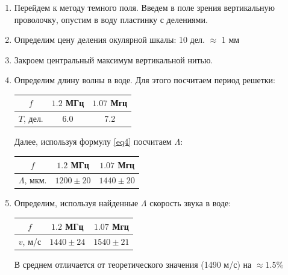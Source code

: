 \documentclass[a4paper, 12pt]{article}
\begin{document}
\begin{enumerate}
        \item Перейдем к методу темного поля. Введем в поле зрения вертикальную проволочку, опустим в воду пластинку с делениями.
        \item Определим цену деления окулярной шкалы: 10 дел. $\approx$ 1 мм
        \item Закроем центральный максимум вертикальной нитью.
        \item Определим длину волны в воде. Для этого посчитаем период решетки:
        
            \begin{tabular}{|c|c|c|} \hline
                $f$ & $1.2$ МГц & $1.07$ Мгц \\ \hline
                $T$, дел. & 6.0 & 7.2 \\ \hline                
            \end{tabular}

            Далее, используя формулу \ref{eq4} посчитаем $\Lambda$:

            \begin{tabular}{|c|c|c|} \hline
                $f$ & $1.2$ МГц & $1.07$ Мгц \\ \hline
                $\Lambda$, мкм. & $1200 \pm 20$ & $1440 \pm 20$ \\ \hline                
            \end{tabular}
        \item Определим, используя найденные $\Lambda$ скорость звука в воде:
        
            \begin{tabular}{|c|c|c|} \hline
                $f$ & $1.2$ МГц & $1.07$ Мгц \\ \hline
                $v$, м/с & $1440 \pm 24$ & $1540 \pm 21$ \\ \hline                
            \end{tabular}

            В среднем отличается от теоретического значения (1490 м/с) на $\approx 1.5\%$
    \end{enumerate}
\end{document}
